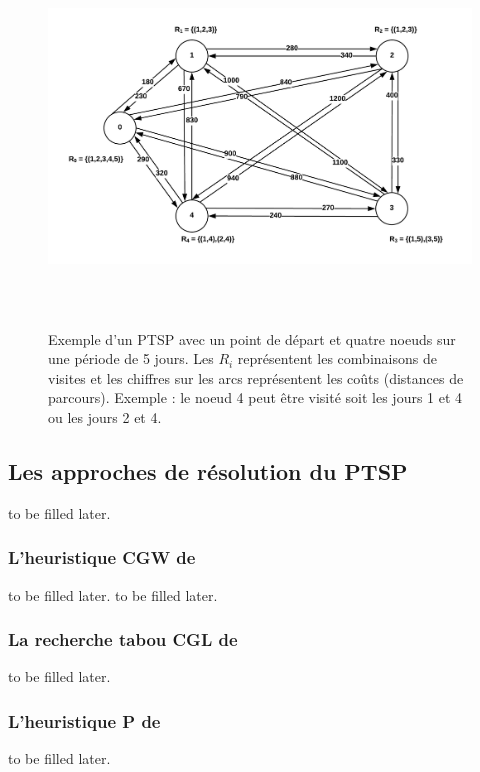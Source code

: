 \begin{figure}[hbt!]
  \centering
  \includegraphics[height=10cm]{images_pfe/PTSP_EXAMPLE.png}
  \caption{Exemple d'un PTSP avec un point de départ et quatre noeuds sur une période de 5 jours. Les $R_i$ représentent les combinaisons de visites et les chiffres sur les arcs représentent les coûts (distances de parcours). Exemple : le noeud 4 peut être visité soit les jours 1 et 4 ou les jours 2 et 4. }
  \label{fig:ptsp-first-example}
\end{figure}
\FloatBarrier



\subsection{Les approches de résolution du PTSP}to be filled later.

\medskip

\subsubsection{L'heuristique CGW de \parencite{chao_new_1995}}to be filled later. to be filled later.

\subsubsection{La recherche tabou CGL de \parencite{cordeau_tabu_1997} }to be filled later.

\medskip

\subsubsection{L'heuristique P de \parencite{paletta_period_2002}}to be filled later.

